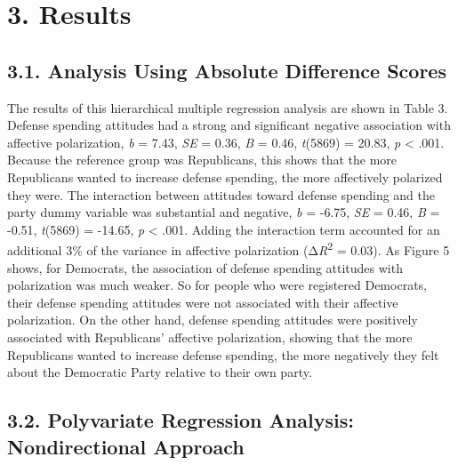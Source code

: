 \documentclass[authordate, meta, issue]{jote-new-article}
\begin{document}
	\section{3. Results}



	\subsection{3.1. Analysis Using Absolute Difference Scores}



	The results of this hierarchical multiple regression analysis are shown in Table 3. Defense spending attitudes had a strong and significant negative association with affective polarization, \emph{b }= 7.43, \emph{SE }= 0.36, \emph{B }= 0.46, \emph{t}(5869) = 20.83, \emph{p }< .001. Because the reference group was Republicans, this shows that the more Republicans wanted to increase defense spending, the more affectively polarized they were.\emph{ }The interaction between attitudes toward defense spending and the party dummy variable was substantial and negative, \emph{b} = -6.75, \emph{SE} = 0.46, \emph{B} = -0.51, \emph{t}(5869) = -14.65, \emph{p} < .001. Adding the interaction term accounted for an additional 3\% of the variance in affective polarization (Δ\emph{R}\textsuperscript{2} = 0.03). As Figure 5 shows, for Democrats, the association of defense spending attitudes with polarization was much weaker. So for people who were registered Democrats, their defense spending attitudes were not associated with their affective polarization. On the other hand, defense spending attitudes were positively associated with Republicans' affective polarization, showing that the more Republicans wanted to increase defense spending, the more negatively they felt about the Democratic Party relative to their own party.



	\subsection{3.2. Polyvariate Regression Analysis: Nondirectional Approach}
\end{document}
